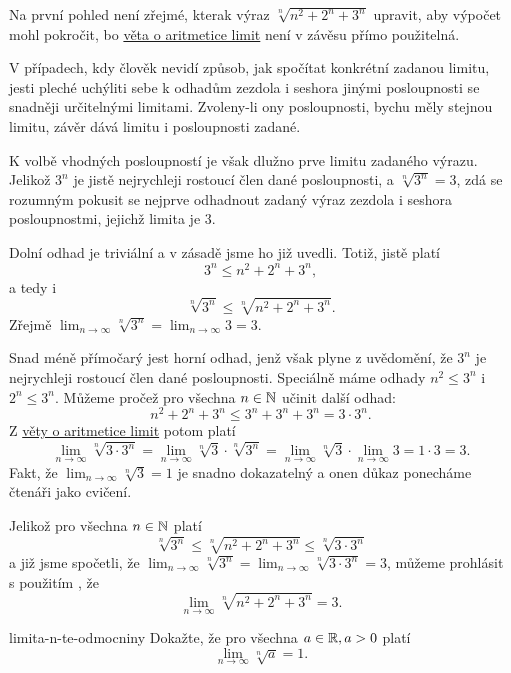 \begin{probsol}
 Na první pohled není zřejmé, kterak výraz $\sqrt[n]{n^2 + 2^{n} + 3^{n}}$
 upravit, aby výpočet mohl pokročit, bo \hyperref[thm:aritmetika-limit]{věta o
 aritmetice limit} není v závěsu 
 přímo použitelná.

 V případech, kdy člověk nevidí způsob, jak spočítat konkrétní zadanou limitu,
 jesti pleché uchýliti sebe k odhadům zezdola i seshora jinými posloupnosti se
 snadněji určitelnými limitami. Zvoleny-li ony posloupnosti, bychu měly stejnou
 limitu, závěr  dává limitu i
 posloupnosti zadané.

 K volbě vhodných posloupností je však dlužno prve  limitu zadaného
 výrazu. Jelikož $3^{n}$ je jistě nejrychleji rostoucí člen dané posloupnosti, a
 $\sqrt[n]{3^{n}} = 3$, zdá se rozumným pokusit se nejprve odhadnout zadaný
 výraz zezdola i seshora posloupnostmi, jejichž limita je $3$.

 Dolní odhad je triviální a v zásadě jsme ho již uvedli. Totiž, jistě platí
 \[
  3^{n} \leq n^2 + 2^{n} + 3^{n},
 \]
 a tedy i
 \[
  \sqrt[n]{3^{n}} \leq \sqrt[n]{n^2 + 2^{n} + 3^{n}}.
 \]
 Zřejmě $\lim_{n \to \infty} \sqrt[n]{3^{n}} = \lim_{n \to \infty} 3 = 3$.

 Snad méně přímočarý jest horní odhad, jenž však plyne z uvědomění, že $3^{n}$
 je nejrychleji rostoucí člen dané posloupnosti. Speciálně máme odhady $n^2 \leq
 3^{n}$ i $2^{n} \leq 3^{n}$. Můžeme pročež pro všechna $n \in \mathbb{N}$ učinit další
 odhad:
 \[
  n^2 + 2^{n} + 3^{n} \leq 3^{n} + 3^{n} + 3^{n} = 3 \cdot 3^{n}.
 \]
 Z \hyperref[thm:aritmetika-limit]{věty o aritmetice limit} potom platí
 \[
  \lim_{n \to \infty} \sqrt[n]{3 \cdot 3^{n}} = \lim_{n \to \infty} \sqrt[n]{3}
  \cdot \sqrt[n]{3^{n}} = \lim_{n \to \infty} \sqrt[n]{3} \cdot \lim_{n \to
  \infty} 3 = 1 \cdot 3 = 3.
 \]
 Fakt, že $\lim_{n \to \infty} \sqrt[n]{3} = 1$ je snadno dokazatelný a onen
 důkaz ponecháme čtenáři jako cvičení.

 Jelikož pro všechna $n \in \mathbb{N}$ platí
 \[
  \sqrt[n]{3^{n}} \leq \sqrt[n]{n^2 + 2^{n} + 3^{n}} \leq \sqrt[n]{3 \cdot
  3^{n}}
 \]
 a již jsme spočetli, že $\lim_{n \to \infty} \sqrt[n]{3^{n}} = \lim_{n \to
 \infty} \sqrt[n]{3 \cdot 3^{n}} = 3$, můžeme prohlásit s použitím
 , že
 \[
  \lim_{n \to \infty} \sqrt[n]{n^2 + 2^{n} + 3^{n}} = 3.
 \]
\end{probsol}

\begin{exercise}{}{limita-n-te-odmocniny}
 Dokažte, že pro všechna $a \in \mathbb{R}, a > 0$ platí
 \[
  \lim_{n \to \infty} \sqrt[n]{a} = 1.
 \]
\end{exercise}
